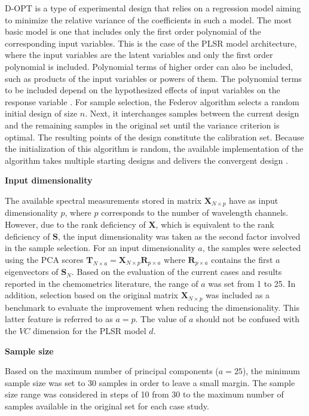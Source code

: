 \documentclass[journal=ancham,manuscript=article]{achemso}
\begin{document}
D-OPT is a type of experimental design that relies on a regression model aiming to minimize the relative variance of the coefficients in such a model\cite{Goos2011}. The most basic model is one that includes only the first order polynomial of the corresponding input variables. This is the case of the PLSR model architecture, where the input variables are the latent variables and only the first order polynomial is included. Polynomial terms of higher order can also be included, such as products of the input variables or powers of them. The polynomial terms to be included depend on the hypothesized effects of input variables on the response variable \cite{Goos2011}. For sample selection, the Federov algorithm selects a random initial design of size $n$. Next, it interchanges samples between the current design and the remaining samples in the original set until the variance criterion is optimal. The resulting points of the design constitute the calibration set. Because the initialization of this algorithm is random, the available implementation of the algorithm takes multiple starting designs and delivers the convergent design \cite{Wheeler2019}.


\textbf{Input dimensionality}

The available spectral measurements stored in matrix $\mathbf{X}_{N\times p}$ have as input dimensionality $p$, where $p$ corresponds to the number of wavelength channels. However, due to the rank deficiency of $\mathbf{X}$, which is equivalent to the rank deficiency of $\mathbf{S}$, the input dimensionality was taken as the second factor involved in the sample selection. For an input dimensionality $a$, the samples were selected using the PCA scores $\mathbf{T}_{N\times a} = \mathbf{X}_{N\times p}\mathbf{R}_{p\times a}$ where $\mathbf{R}_{p\times a}$ contains the first $a$ eigenvectors of $\mathbf{S}_N$. Based on the evaluation of the current cases and results reported in the chemometrics literature, the range of $a$ was set from 1 to 25. In addition, selection based on the original matrix $\mathbf{X}_{N\times p}$ was included as a benchmark to evaluate the improvement when reducing the dimensionality. This latter feature is referred to as $a=p$. The value of $a$ should not be confused with the $VC$ dimension for the PLSR model $d$. 

\textbf{Sample size}

Based on the maximum number of principal components ($a=25$), the minimum sample size was set to 30 samples in order to leave a small margin. The sample size range was considered in steps of 10 from 30 to the maximum number of samples available in the original set for each case study. 
\end{document}
